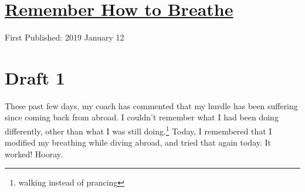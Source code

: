 \documentclass[12pt]{article}[titlepage]
\newcommand{\1}{\={a}}
\newcommand{\2}{\={e}}
\newcommand{\3}{\={\i}}
\newcommand{\4}{\=o}
\newcommand{\5}{\=u}
\newcommand{\6}{\={A}}
\renewcommand{\,}{\textsuperscript{,}}
\begin{document}
\doublespacing
\section{\href{remember-to-breathe.html}{Remember How to Breathe}}
First Published: 2019 January 12
\section{Draft 1}
These past few days, my coach has commented that my hurdle has been suffering since coming back from abroad.
I couldn't remember what I had been doing differently, other than what I was still doing.\footnote{walking instead of prancing}
Today, I remembered that I modified my breathing while diving abroad, and tried that again today.
It worked!
Hooray.
\end{document}
